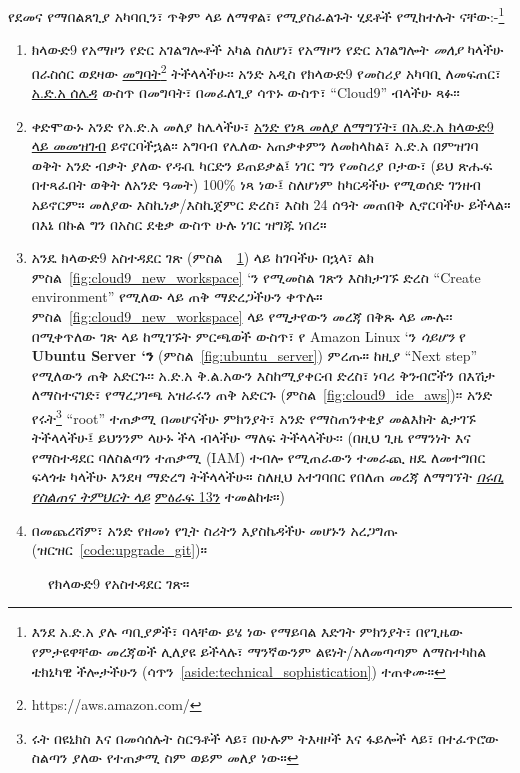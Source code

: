 የደመና የማበልጸጊያ አካባቢን፣ ጥቅም ላይ ለማዋል፣ የሚያስፈልጉት ሂደቶች የሚከተሉት ናቸው:-\footnote{እንደ አ.ድ.አ ያሉ ጣቢያዎች፣ ባላቸው ይሄ ነው የማይባል እድገት ምክንያት፣ በየጊዜው የምታዩዋቸው መረጃወች ሊለያዩ ይችላሉ፣ ማንኛውንም ልዩነት/አለመጣጣም ለማስተካከል ቴክኒካዊ ችሎታችሁን (ሳጥን~\ref{aside:technical_sophistication}) ተጠቀሙ።}
\begin{enumerate}
\item ክላውድ9 የአማዞን የድር አገልግሎቶች አካል ስለሆነ፣ የአማዞን የድር አገልግሎት \emph{መለያ} ካላችሁ በራስሰር ወደዛው \href{https://aws.amazon.com/}{መግባት}\footnote{https://aws.amazon.com/} ትችላላችሁ፡፡ አንድ አዲስ የክላውድ9 የመስሪያ አካባቢ ለመፍጠር፣ \href{https://console.aws.amazon.com/}{አ.ድ.አ ሰሌዳ} ውስጥ በመግባት፣ በመፈለጊያ ሳጥኑ ውስጥ፣ ``Cloud9'' ብላችሁ ጻፉ፡፡
\item ቀድሞውኑ አንድ የአ.ድ.አ መለያ ከሌላችሁ፣ \href{https://www.railstutorial.org/cloud9-signup}{አንድ የነጻ መለያ ለማግኘት፣ በአ.ድ.አ ክላውድ9 ላይ መመዝገብ} ይኖርባችኋል፡፡ አግባብ የሌለው አጠቃቀምን ለመከላከል፣ አ.ድ.አ በምዝገባ ወቅት አንድ ብቃት ያለው የዱቤ ካርድን ይጠይቃል፤ ነገር ግን የመስሪያ ቦታው፣ (ይህ ጽሑፍ በተጻፈበት ወቅት ለአንድ ዓመት) 100\% ነጻ ነው፤ ስለሆነም ከካርዳችሁ የሚወሰድ ገንዘብ አይኖርም። መለያው እስኪነቃ/እስኪጀምር ድረስ፣ እስከ 24 ሰዓት መጠበቅ ሊኖርባችሁ ይችላል። በእኔ በኩል ግን በአስር ደቂቃ ውስጥ ሁሉ ነገር ዝግጁ ነበረ።
\item አንዴ ክላውድ9 አስተዳደር ገጽ (ምስል~~\ref{fig:cloud9_page_aws}) ላይ ከገባችሁ በኋላ፣ ልክ ምስል~\ref{fig:cloud9_new_workspace} `ን የሚመስል ገጽን እስክታገኙ ድረስ ``Create environment'' የሚለው ላይ ጠቅ ማድረጋችሁን ቀጥሉ። ምስል~\ref{fig:cloud9_new_workspace} ላይ የሚታየውን መረጃ በቅጹ ላይ ሙሉ፡፡ በሚቀጥለው ገጽ ላይ ከሚገኙት ምርጫወች ውስጥ፣ የ Amazon Linux `ን \emph{ሳይሆን} የ \textbf{Ubuntu Server `ን} (ምስል~\ref{fig:ubuntu_server}) ምረጡ። ከዚያ ``Next step'' የሚለውን ጠቅ አድርጉ፡፡ አ.ድ.አ ቅ.ል.አውን እስከሚያቀርብ ድረስ፣ ነባሪ ቅንብሮችን በእሽታ ለማስተናገድ፣ የማረጋገጫ አዝራሩን ጠቅ አድርጉ (ምስል~\ref{fig:cloud9_ide_aws})፡፡ አንድ የሩት\footnote{ሩት በዩኒክስ እና በመሳሰሉት ስርዓቶች ላይ፣ በሁሉም ትእዛዞች እና ፋይሎች ላይ፣ በተፈጥሮው ስልጣን ያለው የተጠቃሚ ስም ወይም መለያ ነው።} ``root'' ተጠቃሚ በመሆናችሁ ምክንያት፣ አንድ የማስጠንቀቂያ መልእክት ልታገኙ ትችላላችሁ፤ ይህንንም ላሁኑ ችላ ብላችሁ ማለፍ ትችላላችሁ፡፡ (በዚህ ጊዜ የማንነት እና የማስተዳደር ባለስልጣን ተጠቃሚ (IAM) ተብሎ የሚጠራውን ተመራጪ ዘዴ ለመተግበር ፍላጎቱ ካላችሁ እንደዛ ማድረግ ትችላላችሁ። ስለዚህ አተገባበር የበለጠ መረጃ ለማግኘት \href{https://www.railstutorial.org/}{\emph{በሩቢ የስልጠና ትምህርት ላይ}} \href{https://www.railstutorial.org/book/user_microposts#sec-image_upload_in_production}{ምዕራፍ 13ን} ተመልከቱ።)
\item በመጨረሻም፣ አንድ የዘመነ የጊት ስሪትን እያስኬዳችሁ መሆኑን አረጋግጡ (ዝርዝር~\ref{code:upgrade_git})።
\end{enumerate}

\begin{figure}
\begin{center}
\end{center}
\caption{የክላውድ9 የአስተዳደር ገጽ።\label{fig:cloud9_page_aws}}
\end{figure}

